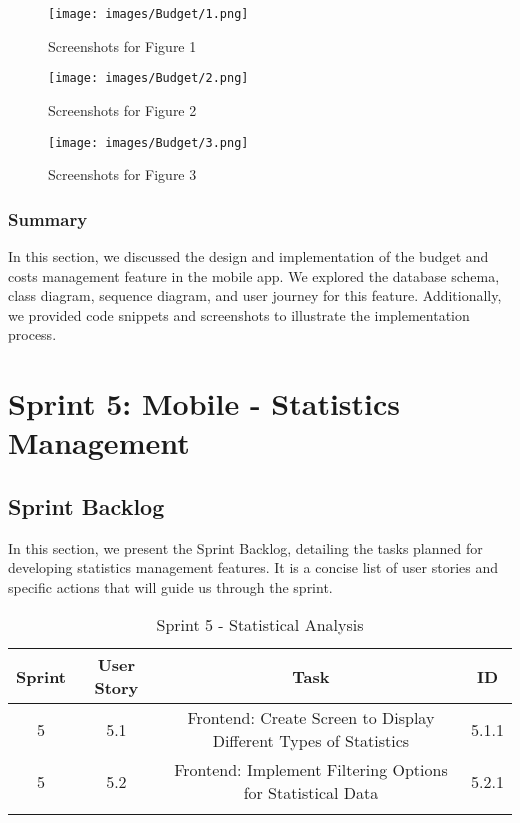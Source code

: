 \begin{figure}[H]
    \centering
    \texttt{[image: images/Budget/1.png]}
    \caption{Screenshots for Figure 1}
    \label{fig:screenshots_figure1}
\end{figure}

\begin{figure}[H]
    \centering
    \texttt{[image: images/Budget/2.png]}
    \caption{Screenshots for Figure 2}
    \label{fig:screenshots_figure2}
\end{figure}

\begin{figure}[H]
    \centering
    \texttt{[image: images/Budget/3.png]}
    \caption{Screenshots for Figure 3}
    \label{fig:screenshots_figure3}
\end{figure}


\subsubsection{Summary}

In this section, we discussed the design and implementation of the budget and costs management feature in the mobile app. We explored the database schema, class diagram, sequence diagram, and user journey for this feature. Additionally, we provided code snippets and screenshots to illustrate the implementation process.

\section{Sprint 5: Mobile - Statistics Management}

\subsection{Sprint Backlog}

In this section, we present the Sprint Backlog, detailing the tasks planned for developing statistics management features. It is a concise list of user stories and specific actions that will guide us through the sprint.

\setlength{\LTleft}{0pt}
\begin{longtable}{|c|c|c|c|}
\hline
\textbf{Sprint} & \textbf{User Story} & \textbf{Task} & \textbf{ID} \\
\hline
5 & 5.1 & Frontend: Create Screen to Display Different Types of Statistics & 5.1.1 \\
\hline
5 & 5.2 & Frontend: Implement Filtering Options for Statistical Data & 5.2.1 \\
\hline
\caption{Sprint 5 - Statistical Analysis}
\label{tab:sprint5_backlog}
\end{longtable}

